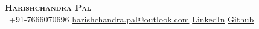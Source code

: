
\begin{center}
    \textbf{\LARGE \scshape Harishchandra Pal} \\ \vspace{-1mm}
    \smallskip
    \smallskip
    \smallskip
     \ \small +91-7666070696 \quad
    \href{mailto:firstlast@gmail.com}{ {harishchandra.pal@outlook.com}} \quad
    \href{https://www.linkedin.com/in/}{ {\href{https://www.linkedin.com/in/hpal007/}{LinkedIn}}} \quad
    \href{https://github.com/}{ {\href{https://github.com/hpal007}{Github}}} \quad
\end{center}